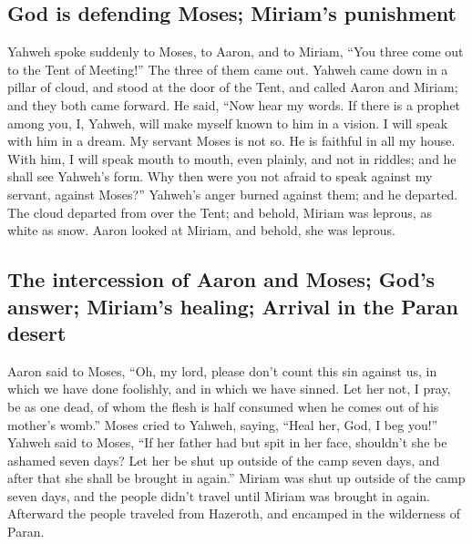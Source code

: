 \hypertarget{god-is-defending-moses-miriams-punishment}{%
\subsection{God is defending Moses; Miriam's
punishment}\label{god-is-defending-moses-miriams-punishment}}

 Yahweh spoke suddenly to Moses, to Aaron, and to Miriam,
``You three come out to the Tent of Meeting!'' The three of them came
out.  Yahweh came down in a pillar of cloud, and stood at
the door of the Tent, and called Aaron and Miriam; and they both came
forward.  He said, ``Now hear my words. If there is a
prophet among you, I, Yahweh, will make myself known to him in a vision.
I will speak with him in a dream.  My servant Moses is not
so. He is faithful in all my house.  With him, I will
speak mouth to mouth, even plainly, and not in riddles; and he shall see
Yahweh's form. Why then were you not afraid to speak against my servant,
against Moses?''  Yahweh's anger burned against them; and
he departed.  The cloud departed from over the Tent; and
behold, Miriam was leprous, as white as snow. Aaron looked at Miriam,
and behold, she was leprous.

\hypertarget{the-intercession-of-aaron-and-moses-gods-answer-miriams-healing-arrival-in-the-paran-desert}{%
\subsection{The intercession of Aaron and Moses; God's answer; Miriam's
healing; Arrival in the Paran
desert}\label{the-intercession-of-aaron-and-moses-gods-answer-miriams-healing-arrival-in-the-paran-desert}}

 Aaron said to Moses, ``Oh, my lord, please don't count
this sin against us, in which we have done foolishly, and in which we
have sinned.  Let her not, I pray, be as one dead, of
whom the flesh is half consumed when he comes out of his mother's
womb.''  Moses cried to Yahweh, saying, ``Heal her, God,
I beg you!''  Yahweh said to Moses, ``If her father had
but spit in her face, shouldn't she be ashamed seven days? Let her be
shut up outside of the camp seven days, and after that she shall be
brought in again.''  Miriam was shut up outside of the
camp seven days, and the people didn't travel until Miriam was brought
in again.  Afterward the people traveled from Hazeroth,
and encamped in the wilderness of Paran.

